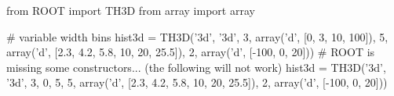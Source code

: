 \begin{footnotesize}
\begin{pyglist}[language=python,texcl=true,style=vs,bgcolor=Moccasin]
from ROOT import TH3D
from array import array

# variable width bins
hist3d = TH3D('3d', '3d', 3, array('d', [0, 3, 10, 100]),
                          5, array('d', [2.3, 4.2, 5.8, 10, 20, 25.5]),
                          2, array('d', [-100, 0, 20]))
# ROOT is missing some constructors... (the following will not work)
hist3d = TH3D('3d', '3d', 3, 0, 5,
                          5, array('d', [2.3, 4.2, 5.8, 10, 20, 25.5]),
                          2, array('d', [-100, 0, 20]))
\end{pyglist}
\end{footnotesize}
